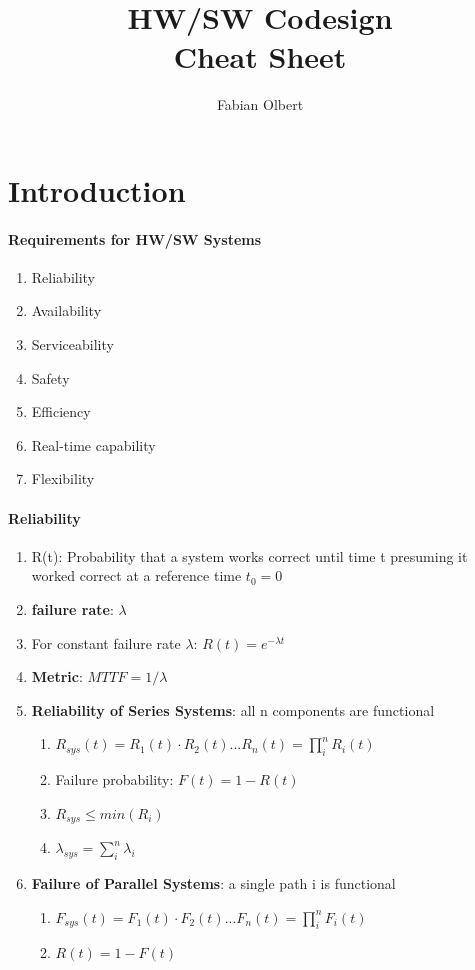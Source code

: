 \documentclass[english]{latex4ei/latex4ei_sheet}
\title{HW/SW Codesign \\ Cheat Sheet}
\author{Fabian Olbert}                    %
\begin{document}
\maketitle   %

\section{Introduction}

\paragraph{Requirements for HW/SW Systems}
\begin{enumerate}
	\item Reliability
	\item Availability
	\item Serviceability
	\item Safety
	\item Efficiency
	\item Real-time capability
	\item Flexibility
\end{enumerate}

\paragraph{Reliability}

\begin{enumerate}
	\item R(t): Probability that a system works correct until time t presuming it worked correct at a reference time $t_0 = 0$
	\item \textbf{failure rate}: $\lambda$
	\item For constant failure rate $\lambda$: $R(t)= e^{-\lambda t} $
	\item \textbf{Metric}: $MTTF = 1 / \lambda$
	\item \textbf{Reliability of Series Systems}: all n components are functional
	\begin{enumerate}
	\item $R_{sys}(t) = R_1(t) \cdot R_2(t)...R_n(t) = \prod_i^n R_i(t)$
	\item Failure probability: $F(t) = 1 - R(t)$
	\item $R_{sys} \leq min(R_i)$
	\item $\lambda_{sys} = \sum_i^n \lambda_i$ 
	\end{enumerate}
        \item \textbf{Failure of Parallel Systems}: a single path i is functional
	\begin{enumerate}
	  \item $F_{sys}(t) = F_1(t) \cdot F_2(t)...F_n(t) = \prod_i^n F_i(t)$
	  \item $R(t) = 1 - F(t)$
	\end{enumerate}

\end{enumerate}
\end{document}

